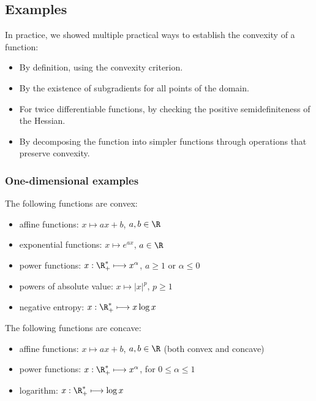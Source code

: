 \subsection{Examples}
In practice, we showed multiple practical ways to establish the convexity of a function:
\begin{itemize}
    \item By definition, using the convexity criterion.
    \item By the existence of subgradients for all points of the domain.
    \item For twice differentiable functions, by checking the positive semidefiniteness of the Hessian.
    \item By decomposing the function into simpler functions through operations that preserve convexity.
\end{itemize}

\subsubsection{One-dimensional examples}
The following functions are convex:
\begin{itemize}
    \item affine functions: $x\longmapsto ax+b$, $a,b\in\R$
    \item exponential functions: $x\longmapsto e^{ax}$, $a\in\R$
    \item power functions: $x:\R^*_+ \longmapsto x^\alpha$, $a\geq 1$ or $\alpha\leq0$
    \item powers of absolute value: $x\longmapsto |x|^p$, $p\geq 1$
    \item negative entropy: $x:\R^*_+ \longmapsto x\log x$
\end{itemize}

The following functions are concave:
\begin{itemize}
    \item affine functions: $x\longmapsto ax+b$, $a,b\in\R$ (both convex and concave)
    \item power functions: $x:\R^*_+ \longmapsto x^\alpha$, for $0\leq\alpha\leq1$
    \item logarithm: $x:\R^*_+ \longmapsto \log x$
\end{itemize}

